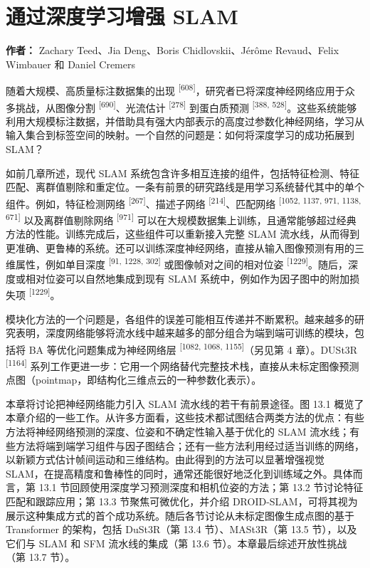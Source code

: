 \chapter{通过深度学习增强 SLAM}

\textbf{作者：} Zachary Teed、Jia Deng、Boris Chidlovskii、Jérôme Revaud、Felix Wimbauer 和 Daniel Cremers

随着大规模、高质量标注数据集的出现 \textsuperscript{[608]}，研究者已将深度神经网络应用于众多挑战，从图像分割 \textsuperscript{[690]}、光流估计 \textsuperscript{[278]} 到蛋白质预测 \textsuperscript{[388, 528]}。这些系统能够利用大规模标注数据，并借助具有强大内部表示的高度过参数化神经网络，学习从输入集合到标签空间的映射。一个自然的问题是：如何将深度学习的成功拓展到 SLAM？

如前几章所述，现代 SLAM 系统包含许多相互连接的组件，包括特征检测、特征匹配、离群值剔除和重定位。一条有前景的研究路线是用学习系统替代其中的单个组件。例如，特征检测网络 \textsuperscript{[267]}、描述子网络 \textsuperscript{[214]}、匹配网络 \textsuperscript{[1052, 1137, 971, 1138, 671]} 以及离群值剔除网络 \textsuperscript{[971]} 可以在大规模数据集上训练，且通常能够超过经典方法的性能。训练完成后，这些组件可以重新接入完整 SLAM 流水线，从而得到更准确、更鲁棒的系统。还可以训练深度神经网络，直接从输入图像预测有用的三维属性，例如单目深度 \textsuperscript{[91, 1228, 302]} 或图像帧对之间的相对位姿 \textsuperscript{[1229]}。随后，深度或相对位姿可以自然地集成到现有 SLAM 系统中，例如作为因子图中的附加损失项 \textsuperscript{[1229]}。

模块化方法的一个问题是，各组件的误差可能相互传递并不断累积。越来越多的研究表明，深度网络能够将流水线中越来越多的部分组合为端到端可训练的模块，包括将 BA 等优化问题集成为神经网络层 \textsuperscript{[1082, 1068, 1155]}（另见第 4 章）。DUSt3R \textsuperscript{[1164]} 系列工作更进一步：它用一个网络替代完整技术栈，直接从未标定图像预测点图（pointmap，即结构化三维点云的一种参数化表示）。

本章将讨论把神经网络能力引入 SLAM 流水线的若干有前景途径。图 13.1 概览了本章介绍的一些工作。从许多方面看，这些技术都试图结合两类方法的优点：有些方法将神经网络预测的深度、位姿和不确定性输入基于优化的 SLAM 流水线；有些方法将端到端学习组件与因子图结合；还有一些方法利用经过适当训练的网络，以新颖方式估计帧间运动和三维结构。由此得到的方法可以显著增强视觉 SLAM，在提高精度和鲁棒性的同时，通常还能很好地泛化到训练域之外。具体而言，第 13.1 节回顾使用深度学习预测深度和相机位姿的方法；第 13.2 节讨论特征匹配和跟踪应用；第 13.3 节聚焦可微优化，并介绍 DROID-SLAM，可将其视为展示这种集成方式的首个成功系统。随后各节讨论从未标定图像生成点图的基于 Transformer 的架构，包括 DuSt3R（第 13.4 节）、MASt3R（第 13.5 节），以及它们与 SLAM 和 SFM 流水线的集成（第 13.6 节）。本章最后综述开放性挑战（第 13.7 节）。


